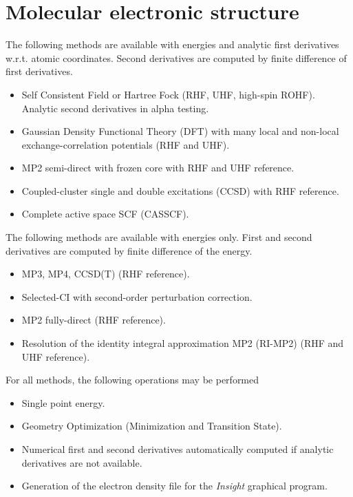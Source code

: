 \label{sec:functionality}

\section{Molecular electronic structure}

The following methods are available with energies and analytic first
derivatives w.r.t. atomic coordinates.  Second derivatives are
computed by finite difference of first derivatives.
\begin{itemize}
\item Self Consistent Field or Hartree Fock (RHF, UHF, high-spin
  ROHF).  Analytic second derivatives in alpha testing.  
\item Gaussian Density Functional Theory (DFT) with many local and
  non-local exchange-correlation potentials (RHF and UHF).
\item MP2 semi-direct with frozen core with RHF and UHF reference.
\item Coupled-cluster single and double excitations (CCSD) with RHF
  reference.
\item Complete active space SCF (CASSCF).
\end{itemize}

The following methods are available with energies only.  First and
second derivatives are computed by finite difference of the energy.
\begin{itemize}
\item MP3, MP4, CCSD(T) (RHF reference).
\item Selected-CI with second-order perturbation correction.
\item MP2 fully-direct (RHF reference).
\item Resolution of the identity integral approximation MP2 (RI-MP2)
  (RHF and UHF reference).
\end{itemize}

For all methods, the following operations may be performed
\begin{itemize}
\item Single point energy.
\item Geometry Optimization (Minimization and Transition State).
\item Numerical first and second derivatives automatically computed if
  analytic derivatives are not available.
\item Generation of the electron density file for the {\em Insight}
      graphical program.
\end{itemize}

